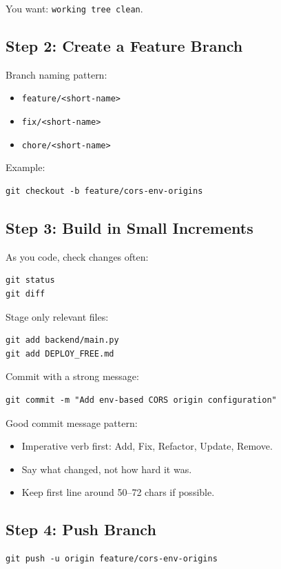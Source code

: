 \documentclass[11pt,a4paper]{article}
\begin{document}
You want: \texttt{working tree clean}.

\subsection{Step 2: Create a Feature Branch}
Branch naming pattern:
\begin{itemize}[leftmargin=1.5em]
  \item \texttt{feature/<short-name>}
  \item \texttt{fix/<short-name>}
  \item \texttt{chore/<short-name>}
\end{itemize}

Example:
\begin{Verbatim}[fontsize=\small]
git checkout -b feature/cors-env-origins
\end{Verbatim}

\subsection{Step 3: Build in Small Increments}
As you code, check changes often:
\begin{Verbatim}[fontsize=\small]
git status
git diff
\end{Verbatim}

Stage only relevant files:
\begin{Verbatim}[fontsize=\small]
git add backend/main.py
git add DEPLOY_FREE.md
\end{Verbatim}

Commit with a strong message:
\begin{Verbatim}[fontsize=\small]
git commit -m "Add env-based CORS origin configuration"
\end{Verbatim}

Good commit message pattern:
\begin{itemize}[leftmargin=1.5em]
  \item Imperative verb first: Add, Fix, Refactor, Update, Remove.
  \item Say what changed, not how hard it was.
  \item Keep first line around 50--72 chars if possible.
\end{itemize}

\subsection{Step 4: Push Branch}
\begin{Verbatim}[fontsize=\small]
git push -u origin feature/cors-env-origins
\end{Verbatim}
\end{document}
